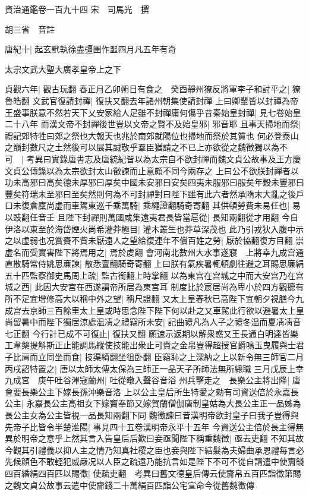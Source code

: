 資治通鑑卷一百九十四
宋　司馬光　撰

胡三省　音註

唐紀十|{
	起玄黓執徐盡彊圉作噩四月凡五年有奇}


太宗文武大聖大廣孝皇帝上之下

貞觀六年|{
	觀古玩翻}
春正月乙卯朔日有食之　癸酉靜州獠反將軍李子和討平之|{
	獠魯皓翻}
文武官復請封禪|{
	復扶又翻去年諸州朝集使請封禪}
上曰卿輩皆以封禪為帝王盛事朕意不然若天下乂安家給人足雖不封禪庸何傷乎昔秦始皇封禪|{
	見七卷始皇二十八年}
而漢文帝不封禪後世豈以文帝之賢不及始皇邪|{
	邪音耶}
且事天掃地而祭|{
	禮記郊特牲曰郊之祭也大報天也兆於南郊就陽位也掃地而祭於其質也}
何必登泰山之巔封數尺之土然後可以展其誠敬乎羣臣猶請之不已上亦欲從之魏徵獨以為不可　|{
	考異曰實錄唐書志及唐統紀皆以為太宗自不欲封禪而魏文貞公故事及王方慶文貞公傳錄以為太宗欲封太山徵諫而止意頗不同今兩存之}
上曰公不欲朕封禪者以功未高邪曰高矣德未厚邪曰厚矣中國未安邪曰安矣四夷未服邪曰服矣年穀未豐邪曰豐矣符瑞未至邪曰至矣然則何為不可封禪對曰陛下雖有此六者然承隋末大亂之後戶口未復倉廩尚虚而車駕東巡千乘萬騎|{
	乘繩證翻騎奇寄翻}
其供頓勞費未易任也|{
	易以豉翻任音壬}
且陛下封禪則萬國咸集遠夷君長皆當扈從|{
	長知兩翻從才用翻}
今自伊洛以東至於海岱煙火尚希灌莽極目|{
	灌木叢生也莽草深茂也}
此乃引戎狄入腹中示之以虚弱也况賞賚不貲未厭遠人之望給復連年不償百姓之勞|{
	厭於協翻復方目翻}
崇虚名而受實害陛下將焉用之|{
	焉於䖍翻}
會河南北數州大水事遂寢　上將幸九成宫通直散騎常侍姚思亷諫|{
	散悉亶翻騎奇寄翻}
上曰朕有氣疾暑輒頓劇往避之耳賜思廉絹五十匹監察御史馬周上疏|{
	監古銜翻上時掌翻}
以為東宫在宫城之中而大安宫乃在宫城之西|{
	此因大安宫在西遂謂帝所居為東宫耳}
制度比於宸居尚為卑小於四方觀聽有所不足宜增修高大以稱中外之望|{
	稱尺證翻}
又太上皇春秋已高陛下宜朝夕視膳今九成宫去京師三百餘里太上皇或時思念陛下陛下何以赴之又車駕此行欲以避暑太上皇尚留暑中而陛下獨居涼處温凊之禮竊所未安|{
	記曲禮凡為人子之禮冬温而夏凊凊音七正翻}
今行計已成不可復止|{
	復扶又翻}
願速示返期以解衆惑又王長通白明達皆樂工韋槃提斛斯正止能調馬縱使技能出衆止可賚之金帛豈得超授官爵鳴玉曳履與士君子比肩而立同坐而食|{
	技渠綺翻坐徂卧翻}
臣竊恥之上深納之上以新令無三師官二月丙戌詔特置之|{
	唐以太師太傅太保為三師正一品天子所師法無所總職}
三月戊辰上幸九成宮　庚午吐谷渾寇蘭州|{
	吐從暾入聲谷音浴}
州兵擊走之　長樂公主將出降|{
	唐會要長樂公主下嫁長孫沖樂音洛}
上以公主皇后所生特愛之勑有司資送倍於永嘉長公主|{
	永嘉長公主高祖女下嫁竇奉節又嫁賀蘭僧伽唐制皇姑為大長公主正一品姊為長公主女為公主皆視一品長知兩翻下同}
魏徵諫曰昔漢明帝欲封皇子曰我子豈得與先帝子比皆令半楚淮陽|{
	事見四十五卷漢明帝永平十五年}
今資送公主倍於長主得無異於明帝之意乎上然其言入告皇后后歎曰妾亟聞陛下稱重魏徵|{
	亟去吏翻}
不知其故今觀其引禮義以抑人主之情乃知真社稷之臣也妾與陛下結髮為夫婦曲承恩禮每言必先候顔色不敢輕犯威嚴况以人臣之疏遠乃能抗言如是陛下不可不從自請遣中使齎錢四百緍絹四百匹以賜徵|{
	使疏吏翻　考異曰舊文德皇后傳云使齎帛五百匹詣徵第賜之魏文貞公故事云遣中使齎錢二十萬絹百匹詣公宅宣命今從舊魏徵傳}
